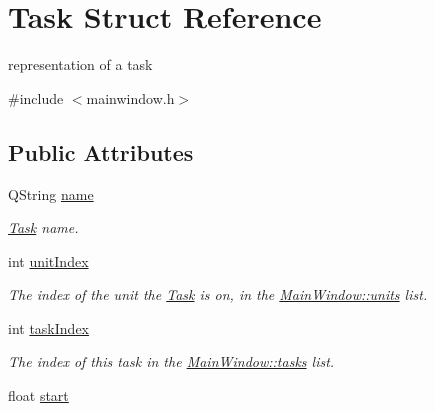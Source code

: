\hypertarget{struct_task}{}\section{Task Struct Reference}
\label{struct_task}


representation of a task  




{\ttfamily \#include $<$mainwindow.\+h$>$}

\subsection*{Public Attributes}
\begin{DoxyCompactItemize}
\item 
\hypertarget{struct_task_a309b1c21e5d2ac19c5ed3c20bb2aa157}{}Q\+String \hyperlink{struct_task_a309b1c21e5d2ac19c5ed3c20bb2aa157}{name}\label{struct_task_a309b1c21e5d2ac19c5ed3c20bb2aa157}

\begin{DoxyCompactList}\small\item\em \hyperlink{struct_task}{Task} name. \end{DoxyCompactList}\item 
\hypertarget{struct_task_a39948d136b05540e7ad6dd1574e698a3}{}int \hyperlink{struct_task_a39948d136b05540e7ad6dd1574e698a3}{unit\+Index}\label{struct_task_a39948d136b05540e7ad6dd1574e698a3}

\begin{DoxyCompactList}\small\item\em The index of the unit the \hyperlink{struct_task}{Task} is on, in the \hyperlink{class_main_window_aad7505c53a0ad219080b3c1b1d1ef1e6}{Main\+Window\+::units} list. \end{DoxyCompactList}\item 
\hypertarget{struct_task_a57c58377752649d07774496b713a3b62}{}int \hyperlink{struct_task_a57c58377752649d07774496b713a3b62}{task\+Index}\label{struct_task_a57c58377752649d07774496b713a3b62}

\begin{DoxyCompactList}\small\item\em The index of this task in the \hyperlink{class_main_window_ab302362b256360d527a628bdbfcde171}{Main\+Window\+::tasks} list. \end{DoxyCompactList}\item 
\hypertarget{struct_task_aeec61bc8f3ff22ea69e6fe24723211f1}{}float \hyperlink{struct_task_aeec61bc8f3ff22ea69e6fe24723211f1}{start}\label{struct_task_aeec61bc8f3ff22ea69e6fe24723211f1}


\end{DoxyCompactItemize}
